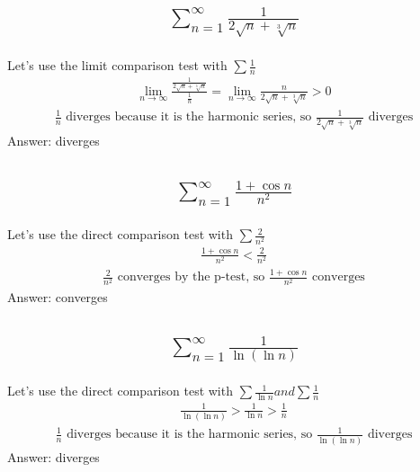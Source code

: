\documentclass{article}
\begin{document}
\subsection{
	\begin{align*}
		\sum_{n = 1}^{\infty} \frac{1}{2\sqrt{n} + \sqrt[3]{n}}
	\end{align*}
}
Let's use the limit comparison test with $\sum \frac{1}{n}$
\begin{align*}
	\lim_{n \to \infty} \frac{\frac{1}{2\sqrt{n} + \sqrt[3]{n}}}{\frac{1}{n}} = \lim_{n \to \infty} {\frac{n}{2\sqrt{n} + \sqrt[3]{n}}} > 0
\end{align*}
\begin{align*}
	\frac{1}{n} \text{ diverges because it is the harmonic series, so } \frac{1}{2\sqrt{n} + \sqrt[3]{n}} \text{ diverges}
\end{align*}
Answer: diverges

\subsection{
	\begin{align*}
		\sum_{n = 1}^{\infty} \frac{1 + \cos{n}}{n^2}
	\end{align*}
}
Let's use the direct comparison test with $\sum \frac{2}{n^2}$
\begin{align*}
	\frac{1 + \cos{n}}{n^2} < \frac{2}{n^2}
\end{align*}
\begin{align*}
	\frac{2}{n^2} \text{ converges by the p-test, so } \frac{1 + \cos{n}}{n^2} \text{ converges}
\end{align*}
Answer: converges

\subsection{
	\begin{align*}
		\sum_{n = 1}^{\infty} \frac{1}{\ln{(\ln{n})}}
	\end{align*}
}
Let's use the direct comparison test with $\sum \frac{1}{\ln{n}} and \sum \frac{1}{n}$
\begin{align*}
	\frac{1}{\ln{(\ln{n})}} > \frac{1}{\ln{n}} > \frac{1}{n}
\end{align*}
\begin{align*}
	\frac{1}{n} \text{ diverges because it is the harmonic series, so } \frac{1}{\ln{(\ln{n})}} \text{ diverges}
\end{align*}
Answer: diverges
\end{document}
